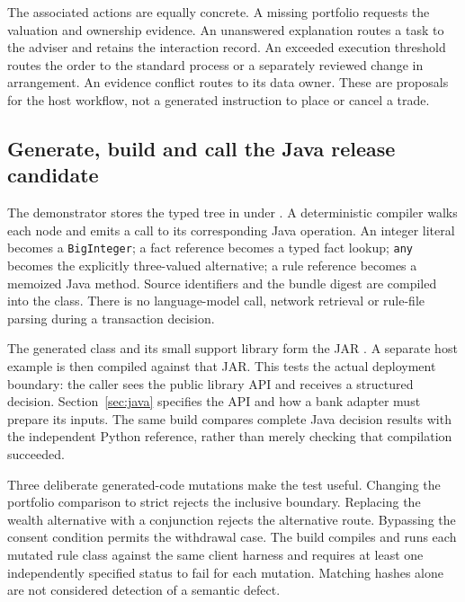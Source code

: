 \documentclass[12pt,a4paper,oneside,openany]{book}
\begin{document}
The associated actions are equally concrete. A missing portfolio requests the
valuation and ownership evidence. An unanswered explanation routes a task to the
adviser and retains the interaction record. An exceeded execution threshold
routes the order to the standard process or a separately reviewed change in
arrangement. An evidence conflict routes to its data owner. These are proposals
for the host workflow, not a generated instruction to place or cancel a trade.

\subsection{Generate, build and call the Java release candidate}
\label{merge:P-01b-complete-dry-run:05}


The demonstrator stores the typed tree in 
under . A deterministic
compiler walks each node and emits a call to its corresponding Java operation.
An integer literal becomes a \texttt{BigInteger}; a fact reference becomes a
typed fact lookup; \texttt{any} becomes the explicitly three-valued alternative;
a rule reference becomes a memoized Java method. Source identifiers and the
bundle digest are compiled into the class. There is no language-model call,
network retrieval or rule-file parsing during a transaction decision.

The generated class and its small support library form the JAR
. A separate host example is
then compiled against that JAR. This tests the actual deployment boundary:
the caller sees the public library API and receives a structured decision.
Section~\ref{sec:java} specifies the API and how a bank adapter must prepare
its inputs. The same build compares complete Java decision results with the
independent Python reference, rather than merely checking that compilation
succeeded.

Three deliberate generated-code mutations make the test useful. Changing the
portfolio comparison to strict rejects the inclusive boundary. Replacing the
wealth alternative with a conjunction rejects the alternative route. Bypassing
the consent condition permits the withdrawal case. The build compiles and runs
each mutated rule class against the same client harness and requires at least
one independently specified status to fail for each mutation. Matching hashes
alone are not considered detection of a semantic defect.
\end{document}

